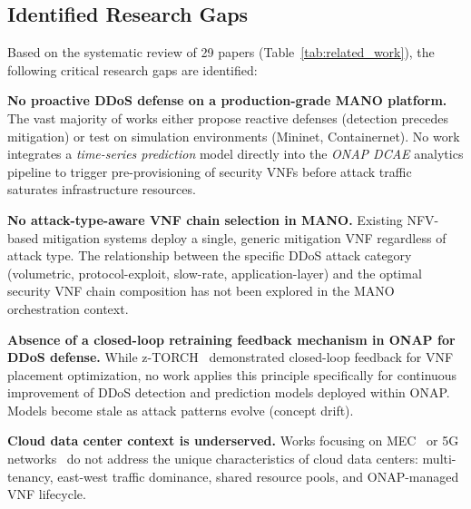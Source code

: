 \documentclass[12pt, a4paper]{article}
\begin{document}
\subsection{Identified Research Gaps}

Based on the systematic review of 29 papers (Table~\ref{tab:related_work}),
the following critical research gaps are identified:

\begin{description}[leftmargin=1.5cm, labelwidth=1.2cm, font=\bfseries\color{attackred}]

\item[Gap 1.] \textbf{No proactive DDoS defense on a production-grade MANO
platform.}
The vast majority of works either propose reactive defenses (detection
precedes mitigation) or test on simulation environments (Mininet,
Containernet). No work integrates a \textit{time-series prediction} model
directly into the \textit{ONAP DCAE} analytics pipeline to trigger
pre-provisioning of security VNFs before attack traffic saturates
infrastructure resources.

\item[Gap 2.] \textbf{No attack-type-aware VNF chain selection in MANO.}
Existing NFV-based mitigation systems deploy a single, generic mitigation
VNF regardless of attack type. The relationship between the specific DDoS
attack category (volumetric, protocol-exploit, slow-rate, application-layer)
and the optimal security VNF chain composition has not been explored in the
MANO orchestration context.

\item[Gap 3.] \textbf{Absence of a closed-loop retraining feedback mechanism
in ONAP for DDoS defense.}
While z-TORCH~\cite{zTORCH2018} demonstrated closed-loop feedback for VNF
placement optimization, no work applies this principle specifically for
continuous improvement of DDoS detection and prediction models deployed
within ONAP. Models become stale as attack patterns evolve (concept drift).

\item[Gap 4.] \textbf{Cloud data center context is underserved.}
Works focusing on MEC~\cite{guo2021nfv} or 5G networks~\cite{zein2025reactive}
do not address the unique characteristics of cloud data centers:
multi-tenancy, east-west traffic dominance, shared resource pools, and
ONAP-managed VNF lifecycle.

\end{description}

\end{document}
